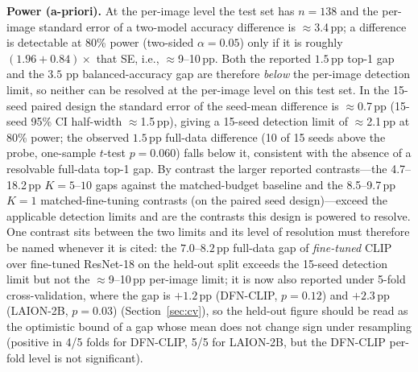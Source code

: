 \documentclass[10pt,a4paper]{article}
\begin{document}
\textbf{Power (a-priori).} At the per-image level the test set has $n=138$ and the per-image standard error of a two-model accuracy difference is $\approx$3.4\,pp; a difference is detectable at 80\% power (two-sided $\alpha=0.05$) only if it is roughly $(1.96+0.84)\times$ that SE, i.e., $\approx$9--10\,pp. Both the reported $1.5$\,pp top-1 gap and the $3.5$ pp balanced-accuracy gap are therefore \emph{below} the per-image detection limit, so neither can be resolved at the per-image level on this test set. In the 15-seed paired design the standard error of the seed-mean difference is $\approx$0.7\,pp (15-seed 95\% CI half-width $\approx$1.5\,pp), giving a 15-seed detection limit of $\approx$2.1\,pp at 80\% power; the observed $1.5$\,pp full-data difference (10 of 15 seeds above the probe, one-sample $t$-test $p=0.060$) falls below it, consistent with the absence of a resolvable full-data top-1 gap. By contrast the larger reported contrasts---the 4.7--18.2\,pp $K{=}5$--$10$ gaps against the matched-budget baseline and the 8.5--9.7\,pp $K{=}1$ matched-fine-tuning contrasts (on the paired seed design)---exceed the applicable detection limits and are the contrasts this design is powered to resolve. One contrast sits between the two limits and its level of resolution must therefore be named whenever it is cited: the $7.0$--$8.2$\,pp full-data gap of \emph{fine-tuned} CLIP over fine-tuned ResNet-18 on the held-out split exceeds the 15-seed detection limit but not the $\approx$9--10\,pp per-image limit; it is now also reported under 5-fold cross-validation, where the gap is $+1.2$\,pp (DFN-CLIP, $p{=}0.12$) and $+2.3$\,pp (LAION-2B, $p{=}0.03$) (Section~\ref{sec:cv}), so the held-out figure should be read as the optimistic bound of a gap whose mean does not change sign under resampling (positive in 4/5 folds for DFN-CLIP, 5/5 for LAION-2B, but the DFN-CLIP per-fold level is not significant).
\end{document}
